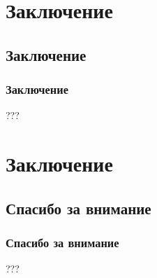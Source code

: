 \documentclass[10pt,t]{beamer}
\begin{document}
\section[Заключение]{Заключение}
\subsection[Заключение]{Заключение}
\begin{frame}
\frametitle{Заключение}
\small

???

\end{frame}

\section[Заключение]{Заключение}
\subsection[Спасибо за внимание]{Спасибо за внимание}
\begin{frame}
\frametitle{Спасибо за внимание}
\small

???

\end{frame}
\end{document}
